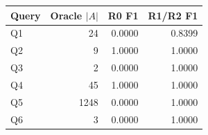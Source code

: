 \begin{tabular}{lrrr}
\toprule
Query & Oracle $|A|$ & R0 F1 & R1/R2 F1 \\
\midrule
Q1 & 24 & 0.0000 & 0.8399 \\
Q2 & 9 & 1.0000 & 1.0000 \\
Q3 & 2 & 0.0000 & 1.0000 \\
Q4 & 45 & 1.0000 & 1.0000 \\
Q5 & 1248 & 0.0000 & 1.0000 \\
Q6 & 3 & 0.0000 & 1.0000 \\
\bottomrule
\end{tabular}
